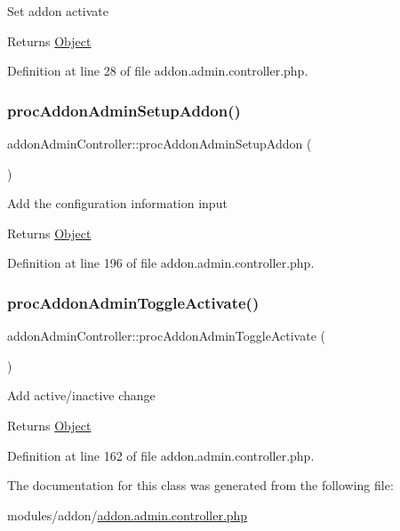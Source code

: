 Set addon activate

\begin{DoxyReturn}{Returns}
\hyperlink{classObject}{Object} 
\end{DoxyReturn}


Definition at line 28 of file addon.\+admin.\+controller.\+php.

\hypertarget{classaddonAdminController_a43db10c21a41c0ebbeb13257d9bf86ea}{}\label{classaddonAdminController_a43db10c21a41c0ebbeb13257d9bf86ea} 
\subsubsection{\texorpdfstring{proc\+Addon\+Admin\+Setup\+Addon()}{procAddonAdminSetupAddon()}}
{\footnotesize\ttfamily addon\+Admin\+Controller\+::proc\+Addon\+Admin\+Setup\+Addon (\begin{DoxyParamCaption}{ }\end{DoxyParamCaption})}

Add the configuration information input

\begin{DoxyReturn}{Returns}
\hyperlink{classObject}{Object} 
\end{DoxyReturn}


Definition at line 196 of file addon.\+admin.\+controller.\+php.

\hypertarget{classaddonAdminController_a97250cb7cb4dc0b78789b8a9186d94d4}{}\label{classaddonAdminController_a97250cb7cb4dc0b78789b8a9186d94d4} 
\subsubsection{\texorpdfstring{proc\+Addon\+Admin\+Toggle\+Activate()}{procAddonAdminToggleActivate()}}
{\footnotesize\ttfamily addon\+Admin\+Controller\+::proc\+Addon\+Admin\+Toggle\+Activate (\begin{DoxyParamCaption}{ }\end{DoxyParamCaption})}

Add active/inactive change

\begin{DoxyReturn}{Returns}
\hyperlink{classObject}{Object} 
\end{DoxyReturn}


Definition at line 162 of file addon.\+admin.\+controller.\+php.



The documentation for this class was generated from the following file\+:\begin{DoxyCompactItemize}
\item 
modules/addon/\hyperlink{addon_8admin_8controller_8php}{addon.\+admin.\+controller.\+php}\end{DoxyCompactItemize}
